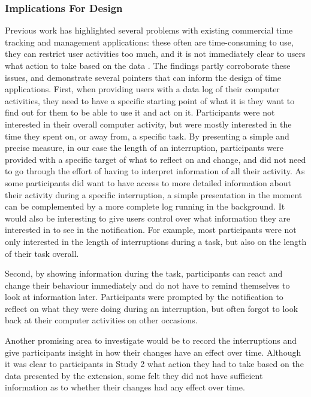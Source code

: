 \subsubsection{Implications For Design}

Previous work has highlighted several problems with existing commercial time tracking and management applications: these often are time-consuming to use, they can restrict user activities too much, and it is not immediately clear to users what action to take based on the data \citep{Collins2014, Whittaker2016}. The findings partly corroborate these issues, and demonstrate several pointers that can inform the design of time applications. 
First, when providing users with a data log of their computer activities, they need to have a specific starting point of what it is they want to find out for them to be able to use it and act on it. Participants were not interested in their overall computer activity, but were mostly interested in the time they spent on, or away from, a specific task. By presenting a simple and precise measure, in our case the length of an interruption, participants were provided with a specific target of what to reflect on and change, and did not need to go through the effort of having to interpret information of all their activity. As some participants did want to have access to more detailed information about their activity during a specific interruption, a simple presentation in the moment can be complemented by a more complete log running in the background. It would also be interesting to give users control over what information they are interested in to see in the notification. For example, most participants were not only interested in the length of interruptions during a task, but also on the length of their task overall. 

Second, by showing information during the task, participants can react and change their behaviour immediately and do not have to remind themselves to look at information later. Participants were prompted by the notification to reflect on what they were doing during an interruption, but often forgot to look back at their computer activities on other occasions.

Another promising area to investigate would be to record the interruptions and give participants insight in how their changes have an effect over time. Although it was clear to participants in Study 2 what action they had to take based on the data presented by the extension, some felt they did not have sufficient information as to whether their changes had any effect over time.

